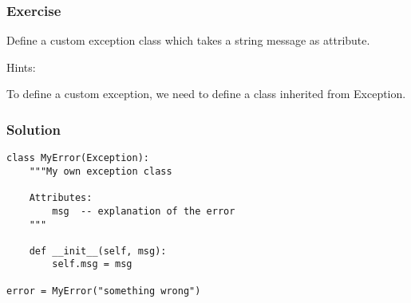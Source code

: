 \begin{frame}[fragile]\frametitle{Exercise}
Define a custom exception class which takes a string message as attribute.

Hints:

To define a custom exception, we need to define a class inherited from Exception.
\end{frame}

\begin{frame}[fragile]\frametitle{Solution}
\begin{lstlisting}
class MyError(Exception):
    """My own exception class

    Attributes:
        msg  -- explanation of the error
    """

    def __init__(self, msg):
        self.msg = msg

error = MyError("something wrong")
\end{lstlisting}
\end{frame}



